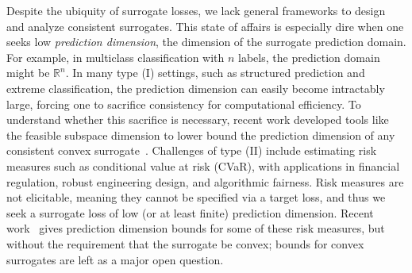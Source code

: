\documentclass[11pt]{article} %
\newcommand{\reals}{\mathbb{R}}
\begin{document}
Despite the ubiquity of surrogate losses, we lack general frameworks to design and analyze consistent surrogates.
This state of affairs is especially dire when one seeks low \emph{prediction dimension}, the dimension of the surrogate prediction domain.
For example, in multiclass classification with $n$ labels, the prediction domain might be $\reals^n$.
In many type (I) settings, such as structured prediction and extreme classification, the prediction dimension can easily become intractably large, forcing one to sacrifice consistency for computational efficiency.
To understand whether this sacrifice is necessary, recent work developed tools like the feasible subspace dimension to lower bound the prediction dimension of any consistent convex surrogate~\citep{ramaswamy2016convex}.
Challenges of type (II) include estimating risk measures such as conditional value at risk (CVaR), with applications in financial regulation, robust engineering design, and algorithmic fairness.
Risk measures are not elicitable, meaning they cannot be specified via a target loss, and thus we seek a surrogate loss of low (or at least finite) prediction dimension.
Recent work~\citep{fissler2016higher,frongillo2020elicitation} gives prediction dimension bounds for some of these risk measures, but without the requirement that the surrogate be convex; bounds for convex surrogates are left as a major open question.
\end{document}

